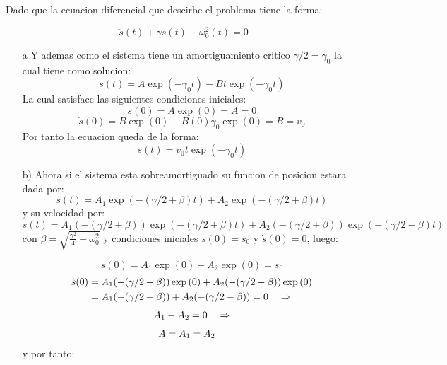 \documentclass[a4paper]{article}
\begin{document}
\begin{answer}[Problema 7]

    Dado que la ecuacion diferencial que descirbe el problema tiene la forma:

    \begin{equation*}
        \ddot{s}(t) + \gamma\dot s(t) + \omega_0^2(t) = 0
    \end{equation*}
    \begin{enumerate}
        \item [a] Y ademas como el sistema tiene un amortiguamiento critico $\gamma/2 =  \gamma_0$ la cual tiene como solucion:
              $$s(t) = A\exp(-\gamma_0t)  - Bt\exp(-\gamma_0 t)$$
              La cual satisface las siguientes condiciones iniciales:
              $$s(0) = A\exp(0) = A = 0 $$
              $$\dot s(0) = B\exp(0) -B(0)\gamma_0\exp(0) = B = v_0$$
              Por tanto la ecuacion queda de la forma:
              $$s(t) = v_0t\exp{(-\gamma_0t)}$$
        \item[b)] Ahora si el sistema esta sobreamortiguado su funcion de posicion estara dada por:
            $$s(t) = A_1\exp{(-(\gamma/2 + \beta )t)}+ A_2\exp{(-(\gamma/2 + \beta )t)}$$
            y su velocidad por:
            $$\dot s(t) = A_1(-(\gamma/2 + \beta ))\exp{(-(\gamma/2 + \beta )t)} + A_2(-(\gamma/2 + \beta ))\exp{(-(\gamma/2 - \beta )t)}$$
            con $\beta = \sqrt{\frac{\gamma^2}{4} - \omega_0^2}$ y condiciones iniciales $s(0) = s_0$ y $\dot s(0) = 0 $, luego:

            \begin{equation*}
                s(0) = A_1\exp{(0)} + A_2\exp{(0)} = s_0
            \end{equation*}
            \begin{equation*}
                \begin{split}
                    \dot s(0) &= A_1(-(\gamma/2 + \beta ))\exp{(0)} + A_2(-(\gamma/2 - \beta ))\exp{(0)}\\
                    &= A_1(-(\gamma/2 + \beta )) + A_2(-(\gamma/2 - \beta )) =0 \hspace{0.35cm} \Rightarrow\\
                \end{split}
            \end{equation*}
            \begin{equation*}
                \begin{split}
                    A_1 - A_2 =0 \hspace{0.35cm} \Rightarrow\\
                \end{split}
            \end{equation*}
            \begin{equation*}
                \begin{split}
                    A  = A_1 = A_2 \hspace{0.35cm} \\
                \end{split}
            \end{equation*}
            y por tanto:


\end{enumerate}
\end{answer}
\end{document}
